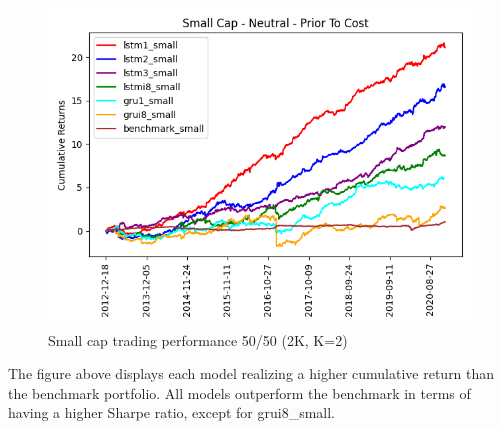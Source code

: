 \begin{figure}[H]
\centering
\includegraphics [scale=0.60,angle=360]{figures/cumulative_small_cap_return_no_cost_n.png}
\caption{Small cap trading performance 50/50 (2K, K=2)}
\label{fig:5050small}
\end{figure} 
\indent\newline 
The figure above displays each model realizing a higher cumulative return than the benchmark portfolio. All models outperform the benchmark in terms of having a higher Sharpe ratio, except for grui8\_small. 

